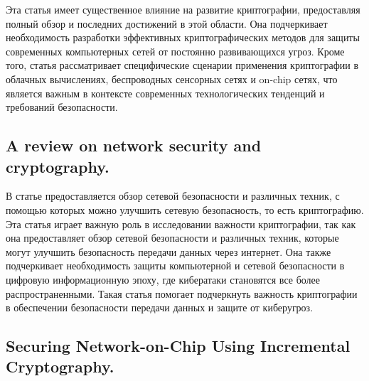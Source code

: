 \documentclass[14pt]{extarticle}
\begin{document}
Эта статья имеет существенное влияние на развитие криптографии, предоставляя полный обзор и последних достижений в этой области. Она подчеркивает необходимость разработки эффективных криптографических методов для защиты современных компьютерных сетей от постоянно развивающихся угроз. Кроме того, статья рассматривает специфические сценарии применения криптографии в облачных вычислениях, беспроводных сенсорных сетях и on-chip сетях, что является важным в контексте современных технологических тенденций и требований безопасности.

\subsection{A review on network security and cryptography.\cite{Article7}}
 В статье предоставляется обзор сетевой безопасности и различных техник, с помощью которых можно улучшить сетевую безопасность, то есть криптографию. Эта статья играет важную роль в исследовании важности криптографии, так как она предоставляет обзор сетевой безопасности и различных техник, которые могут улучшить безопасность передачи данных через интернет. Она также подчеркивает необходимость защиты компьютерной и сетевой безопасности в цифровую информационную эпоху, где кибератаки становятся все более распространенными. Такая статья помогает подчеркнуть важность криптографии в обеспечении безопасности передачи данных и защите от киберугроз.

\subsection{Securing Network-on-Chip Using Incremental Cryptography.\cite{Article8}}
\end{document}
